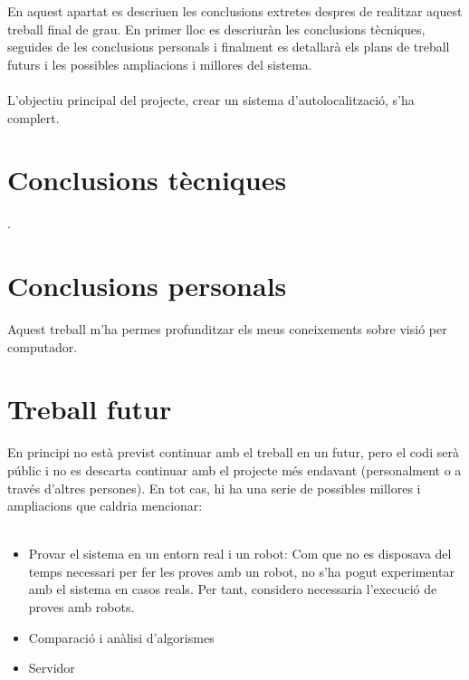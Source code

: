 En aquest apartat es descriuen les conclusions extretes despres de realitzar aquest treball final de grau. En primer lloc es descriuràn les conclusions tècniques, seguides de les conclusions personals
i finalment es detallarà els plans de treball futurs i les possibles ampliacions i millores del sistema.\\\\
L'objectiu principal del projecte, crear un sistema d'autolocalització, s'ha complert.

\section{Conclusions tècniques}
	.
\section{Conclusions personals}
	Aquest treball m'ha permes profunditzar els meus coneixements sobre visió per computador.

\newpage
\section{Treball futur}
	En principi no està previst continuar amb el treball en un futur, pero el codi serà públic i no es descarta continuar amb el projecte més endavant (personalment o a través d'altres persones). En tot cas,
	hi ha una serie de possibles millores i ampliacions que caldria mencionar:\\\\
	
	\begin{itemize}
		\item{Provar el sistema en un entorn real i un robot: Com que no es disposava del temps necessari per fer les proves amb un robot, no s'ha pogut experimentar amb el sistema en casos reals. Per tant,
		considero necessaria l'execució de proves amb robots.}
		\item{Comparació i anàlisi d'algorismes}
		\item{Servidor}
	\end{itemize}
